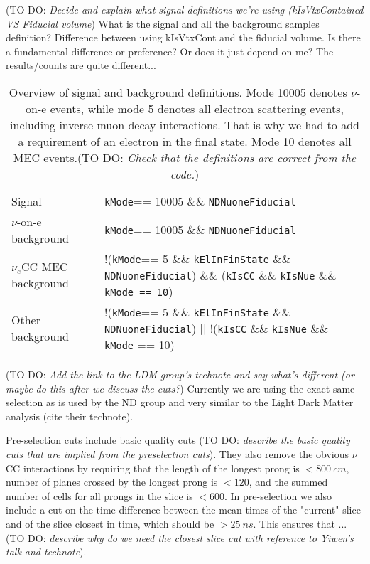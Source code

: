 \documentclass[12pt]{article}
\newcommand{\todo }[1]{({\color{red}\sc TO DO: \textit{#1}})}
\begin{document}
\todo{Decide and explain what signal definitions we're using (kIsVtxContained VS Fiducial volume}
What is the signal and all the background samples definition? Difference between using kIsVtxCont and the fiducial volume. Is there a fundamental difference or preference? Or does it just depend on me? The results/counts are quite different...

\begin{table}[!ht]
\centering
\def\arraystretch{1.4}
\begin{tabular}{p{}p{}}
Signal                   & \texttt{kMode}== 10005 \&\& \texttt{NDNuoneFiducial}\\
$\nu$-on-e background    & \texttt{kMode}== 10005 \&\& \texttt{NDNuoneFiducial}\\
$\nu_e$CC MEC background & !(\texttt{kMode}== 5 \&\& \texttt{kElInFinState} \&\& \texttt{NDNuoneFiducial}) \&\& (\texttt{kIsCC} \&\& \texttt{kIsNue} \&\& \texttt{kMode == 10})\\
Other background         & !(\texttt{kMode}== 5 \&\& \texttt{kElInFinState} \&\& \texttt{NDNuoneFiducial}) $||$ !(\texttt{kIsCC} \&\& \texttt{kIsNue} \&\& \texttt{kMode} == 10)
\end{tabular}
\caption{Overview of signal and background definitions. Mode 10005 denotes $\nu$-on-e events, while mode 5 denotes all electron scattering events, including inverse muon decay interactions. That is why we had to add a requirement of an electron in the final state. Mode 10 denotes all MEC events.\todo{Check that the definitions are correct from the code.}}
\label{tab:SignalDefinitions}
\end{table}

\todo{Add the link to the LDM group's technote and say what's different (or maybe do this after we discuss the cuts?}
Currently we are using the exact same selection as is used by the ND group \cite{NOVA-doc-56383} and very similar to the Light Dark Matter analysis (cite their technote).

Pre-selection cuts include basic quality cuts \todo{describe the basic quality cuts that are implied from the preselection cuts}. They also remove the obvious $\nu$CC interactions by requiring that the length of the longest prong is $<800\ \unit{cm}$, number of planes crossed by the longest prong is $<120$, and the summed number of cells for all prongs in the slice is $<600$. In pre-selection we also include a cut on the time difference between the mean times of the "current" slice and of the slice closest in time, which should be $>25\ \unit{ns}$. This ensures that ... \todo{describe why do we need the closest slice cut with reference to Yiwen's talk and technote}.
\end{document}
